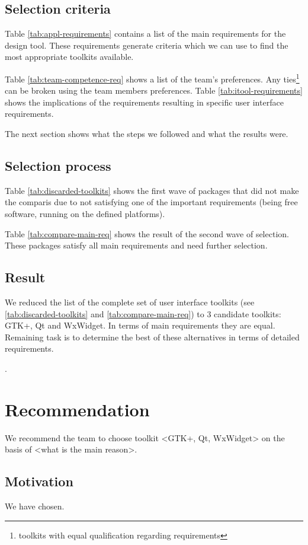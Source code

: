 \subsection{Selection criteria}

Table \ref{tab:appl-requirements} contains a list of the main requirements for
the design tool. These requirements generate criteria which we can use to find
the most appropriate toolkits available.

Table \ref{tab:team-competence-req} shows a list of the team's preferences.
Any ties\footnote{toolkits with equal qualification regarding requirements} can
be broken using the team members preferences. Table
\ref{tab:itool-requirements} shows the implications of the requirements
resulting in specific user interface requirements.

The next section shows what the steps we followed and what the results were.

\subsection{Selection process}

Table \ref{tab:discarded-toolkits} shows the first wave of packages that did
not make the comparis due to not satisfying one of the important requirements
(being free software, running on the defined platforms).

Table \ref{tab:compare-main-req} shows the result of the second wave of
selection. These packages satisfy all main requirements and need further
selection. 

\subsection{Result}

We reduced the list of the complete set of user interface toolkits (see
\ref{tab:discarded-toolkits} and \ref{tab:compare-main-req}) to 3
candidate toolkits: GTK+, Qt and WxWidget. In terms of main requirements they
are equal. Remaining task is to determine the best of these alternatives in
terms of detailed requirements. 

.

\section{Recommendation}

We recommend the team to choose toolkit <GTK+, Qt, WxWidget> on the basis
of <what is the main reason>.

\subsection{Motivation}

We have chosen.
